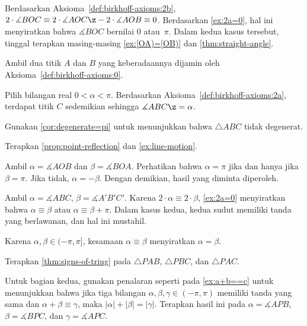 Berdasarkan Aksioma~\ref{def:birkhoff-axioms:2b},
$2\cdot\measuredangle BOC
\equiv 
2\cdot\measuredangle AOC\z-2\cdot \measuredangle AOB
\equiv 0$.
Berdasarkan \ref{ex:2a=0},
hal ini menyiratkan bahwa
$\measuredangle BOC$ bernilai $0$ atau~$\pi$.
Dalam kedua kasus tersebut, tinggal terapkan masing-masing \ref{ex:[OA)=[OB)} dan \ref{thm:straight-angle}.

Ambil dua titik $A$ dan $B$ yang keberadaannya dijamin oleh Aksioma~\ref{def:birkhoff-axioms:0}.

Pilih bilangan real $0<\alpha<\pi$.
Berdasarkan Aksioma~\ref{def:birkhoff-axioms:2a}, terdapat titik $C$ sedemikian sehingga $\measuredangle ABC\z=\alpha$.

Gunakan \ref{cor:degenerate=pi} untuk menunjukkan bahwa $\triangle ABC$ tidak degenerat.


 Terapkan \ref{prop:point-reflection} dan \ref{ex:line-motion}.

\setcounter{eqtn}{0}

Ambil $\alpha=\measuredangle AOB$
dan
$\beta=\measuredangle BOA$.
Perhatikan bahwa $\alpha=\pi$ jika dan hanya jika $\beta=\pi$.
Jika tidak, $\alpha=-\beta$.
Dengan demikian, hasil yang diminta diperoleh.

Ambil $\alpha=\measuredangle ABC$, $\beta=\measuredangle A'B'C'$.
Karena $2\cdot\alpha\equiv 2\cdot \beta$, \ref{ex:2a=0} menyiratkan bahwa
 $\alpha\equiv \beta$ atau $\alpha\equiv \beta+\pi$.
Dalam kasus kedua, kedua sudut memiliki tanda yang berlawanan, dan hal ini mustahil.

Karena $\alpha,\beta\in(-\pi,\pi]$, kesamaan $\alpha\equiv \beta$ menyiratkan $\alpha= \beta$.

Terapkan \ref{thm:signs-of-triug} pada $\triangle PAB$, $\triangle PBC$, dan $\triangle PAC$.

Untuk bagian kedua, gunakan penalaran seperti pada \ref{ex:a+b==c} untuk menunjukkan bahwa jika tiga bilangan $\alpha,\beta,\gamma\in (-\pi,\pi)$ memiliki tanda yang sama dan
$\alpha+\beta\equiv\gamma$, maka
$|\alpha|+|\beta|=|\gamma|$.
Terapkan hasil ini pada $\alpha=\measuredangle APB$,
$\beta=\measuredangle BPC$,
dan
$\gamma=\measuredangle APC$.





